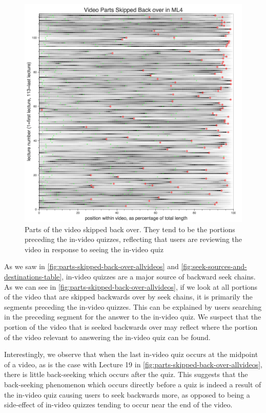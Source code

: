 \documentclass{sigchi}
\begin{document}
\begin{figure}
\includegraphics[width=1.0\columnwidth]{parts-skipped-back-over-allvideos}
\caption{Parts of the video skipped back over. They tend to be the portions preceding the in-video quizzes, reflecting that users are reviewing the video in response to seeing the in-video quiz}
\label{fig:parts-skipped-back-over-allvideos}
\end{figure}

As we saw in \autoref{fig:parts-skipped-back-over-allvideos} and \autoref{fig:seek-sources-and-destinations-table}, in-video quizzes are a major source of backward seek chains. As we can see in \autoref{fig:parts-skipped-back-over-allvideos}, if we look at all portions of the video that are skipped backwards over by seek chains, it is primarily the segments preceding the in-video quizzes. This can be explained by users searching in the preceding segment for the answer to the in-video quiz. We suspect that the portion of the video that is seeked backwards over may reflect where the portion of the video relevant to answering the in-video quiz can be found.

Interestingly, we observe that when the last in-video quiz occurs at the midpoint of a video, as is the case with Lecture 19 in \autoref{fig:parts-skipped-back-over-allvideos}, there is little back-seeking which occurs after the quiz. This suggests that the back-seeking phenomenon which occurs directly before a quiz is indeed a result of the in-video quiz causing users to seek backwards more, as opposed to being a side-effect of in-video quizzes tending to occur near the end of the video.
\end{document}

